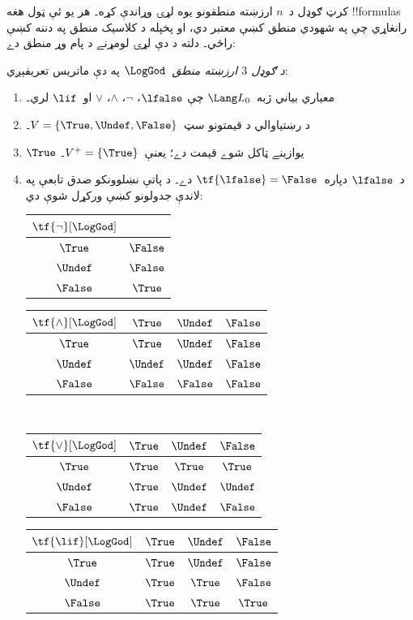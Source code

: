 \documentclass[../../../include/open-logic-section]{subfiles}
\begin{document}


کرټ ګوډل د~$n$ ارزښته منطقونو يوه لړۍ وړاندې کړه۔ هر يو ئې
ټول هغه !!{formula}s رانغاړي چې په شهودي منطق کښې معتبر دي، او
پخپله د کلاسيک منطق په دننه کښې راځي۔ دلته د دې لړۍ لومړنے
د پام وړ منطق دے:

\begin{defn}
\emph{د ګوډل $3$ ارزښته منطق}~$\LogGod$ په دې ماتريس تعريفېږي:
\begin{enumerate}
  \item معياري بياني ژبه~$\Lang L_0$ چې
  $\lfalse$، $\lnot$، $\land$، $\lor$ او~$\lif$ لري۔
  \item د رښتياوالي د قيمتونو سټ~$V = \{\True, \Undef, \False\}$۔
  \item $\True$ يوازينے ټاکل شوے قيمت دے؛ يعنې~$V^+ = \{\True\}$۔
  \item د~$\lfalse$ دپاره~$\tf{\lfalse} = \False$ دے۔ د پاتې
  نښلوونکو صدق تابعې په لاندې جدولونو کښې ورکړل شوې دي:
  \begin{center}
    \begin{tabular}{c|c} 
      $\tf{\lnot}[\LogGod]$ & \\ 
      \hline  
      $\True$ & $\False$ \\ 
      $\Undef$ & $\False$ \\
      $\False$ & $\True$ 
    \end{tabular}
    \quad
    \begin{tabular}{c|ccc} 
      $\tf{\land}[\LogGod]$ & $\True$ & $\Undef$ & $\False$ \\ 
      \hline 
      $\True$ & $\True$ & $\Undef$ & $\False$ \\ 
      $\Undef$ & $\Undef$ & $\Undef$ & $\False$\\ 
      $\False$ & $\False$ & $\False$ & $\False$ 
    \end{tabular}
    \\[2ex]
    \begin{tabular}{c|ccc} 
      $\tf{\lor}[\LogGod]$ & $\True$ & $\Undef$ & $\False$ \\ 
      \hline 
      $\True$ & $\True$ & $\True$ & $\True$ \\ 
      $\Undef$ & $\True$ & $\Undef$ & $\Undef$ \\
      $\False$ & $\True$ & $\Undef$ & $\False$ 
    \end{tabular}
    \quad
    \begin{tabular}{c|ccc} 
      $\tf{\lif}[\LogGod]$ & $\True$ & $\Undef$ & $\False$ \\ 
      \hline 
      $\True$ & $\True$ & $\Undef$ & $\False$ \\ 
      $\Undef$ & $\True$ & $\True$ & $\False$  \\ 
      $\False$ & $\True$ & $\True$ & $\True$ 
    \end{tabular}
  \end{center} 
\end{enumerate}
\end{defn}
\end{document}

